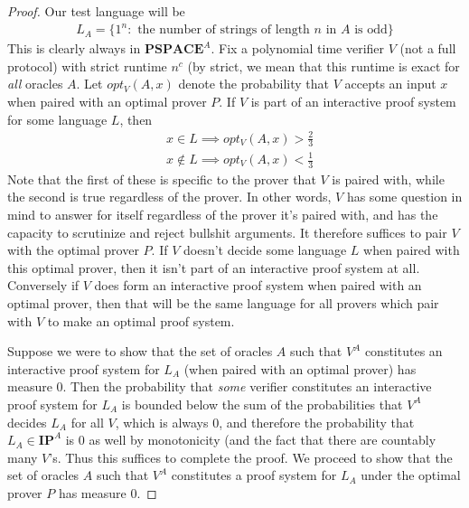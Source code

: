 \documentclass{article}
\theoremstyle{definition}
\theoremstyle{plain}
\theoremstyle{theorem}
\begin{document}
\begin{proof}
	Our test language will be 
	\begin{align}
		L_A = \{1^n: \textrm{ the number of strings of length $n$ in $A$ is odd} \}
	\end{align}
	This is clearly always in $\bm{PSPACE}^A$. Fix a polynomial time verifier $V$ (not a full protocol) with strict runtime $n^c$ (by strict, we mean that this runtime is exact for \emph{all} oracles $A$. Let $opt_V(A,x)$ denote the probability that $V$ accepts an input $x$ when paired with an optimal prover $P$. If $V$ is part of an interactive proof system for some language $L$, then
	\begin{align}
		& x \in L \implies opt_V(A,x) > \frac{2}{3} \\
		& x \notin L \implies opt_V(A,x) < \frac{1}{3}
	\end{align}
	Note that the first of these is specific to the prover that $V$ is paired with, while the second is true regardless of the prover. In other words, $V$ has some question in mind to answer for itself regardless of the prover it's paired with, and has the capacity to scrutinize and reject bullshit arguments. It therefore suffices to pair $V$ with the optimal prover $P$. If $V$ doesn't decide some language $L$ when paired with this optimal prover, then it isn't part of an interactive proof system at all. Conversely if $V$ does form an interactive proof system when paired with an optimal prover, then that will be the same language for all provers which pair with $V$ to make an optimal proof system. \par 
	Suppose we were to show that the set of oracles $A$ such that $V^A$ constitutes an interactive proof system for $L_A$ (when paired with an optimal prover) has measure $0$. Then the probability that \emph{some} verifier constitutes an interactive proof system for $L_A$ is bounded below the sum of the probabilities that $V^A$ decides $L_A$ for all $V$, which is always $0$, and therefore the probability that $L_A \in \bm{IP}^A$ is $0$ as well by monotonicity (and the fact that there are countably many $V$'s. Thus this suffices to complete the proof. We proceed to show that the set of oracles $A$ such that $V^A$ constitutes a proof system for $L_A$ under the optimal prover $P$ has measure $0$. \par 

\end{proof}
\end{document}

